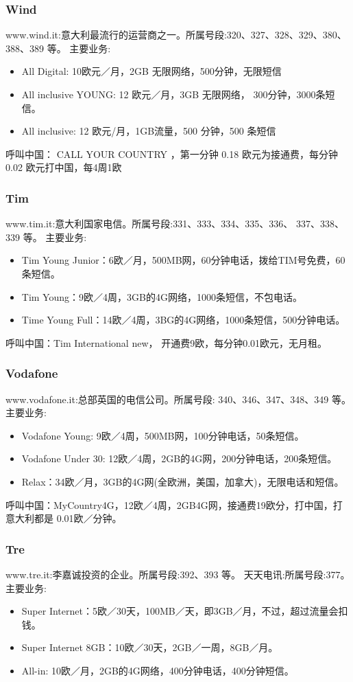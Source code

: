 \subsubsection{Wind}
www.wind.it:意大利最流行的运营商之一。所属号段:320、327、328、329、380、 388、389 等。
主要业务:
\begin{itemize}
\item All Digital: 10欧元／月，2GB 无限网络，500分钟，无限短信
\item All inclusive YOUNG:  12 欧元／月，3GB 无限网络， 300分钟，3000条短信。
\item All inclusive:  12 欧元/月，1GB流量，500 分钟，500 条短信
\end{itemize}
呼叫中国： CALL YOUR COUNTRY ，第一分钟 0.18 欧元为接通费，每分钟 0.02 欧元打中国，每4周1欧

\subsubsection{Tim}
www.tim.it:意大利国家电信。所属号段:331、333、334、335、336、 337、338、339 等。
主要业务:
\begin{itemize}
\item Tim Young Junior：6欧／月，500MB网，60分钟电话，拨给TIM号免费，60条短信。
\item Tim Young：9欧／4周，3GB的4G网络，1000条短信，不包电话。
\item Time Young Full：14欧／4周，3BG的4G网络，1000条短信，500分钟电话。
\end{itemize}
呼叫中国：Tim International new， 开通费9欧，每分钟0.01欧元，无月租。

\subsubsection{Vodafone}
www.vodafone.it:总部英国的电信公司。所属号段: 340、346、347、348、349 等。 
主要业务:
\begin{itemize}
\item Vodafone Young:  9欧／4周，500MB网，100分钟电话，50条短信。
\item Vodafone Under 30:  12欧／4周，2GB的4G网，200分钟电话，200条短信。
\item Relax：34欧／月，3GB的4G网(全欧洲，美国，加拿大)，无限电话和短信。
\end{itemize}
呼叫中国：MyCountry4G，12欧／4周，2GB4G网，接通费19欧分，打中国，打意大利都是 0.01欧／分钟。



\subsubsection{Tre}
www.tre.it:李嘉诚投资的企业。所属号段:392、393 等。 天天电讯:所属号段:377。 
主要业务:
\begin{itemize}
\item  Super Internet：5欧／30天，100MB／天，即3GB／月，不过，超过流量会扣钱。
\item  Super Internet 8GB：10欧／30天，2GB／一周，8GB／月。
\item  All-in: 10欧／月，2GB的4G网络，400分钟电话，400分钟短信。
\end{itemize}


